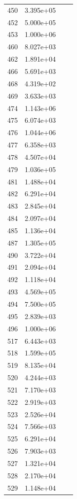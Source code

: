 \documentclass[12pt]{article}
\begin{document}
\begin{longtable}{@{}cccc@{}}
450 & 3.395e+05 &  &  \\
452 & 5.000e+05 &  &  \\
453 & 1.000e+06 &  &  \\
460 & 8.027e+03 &  &  \\
462 & 1.891e+04 &  &  \\
466 & 5.691e+03 &  &  \\
468 & 4.319e+02 &  &  \\
469 & 3.633e+03 &  &  \\
474 & 1.143e+06 &  &  \\
475 & 6.074e+03 &  &  \\
476 & 1.044e+06 &  &  \\
477 & 6.358e+03 &  &  \\
478 & 4.507e+04 &  &  \\
479 & 1.036e+05 &  &  \\
481 & 1.488e+04 &  &  \\
482 & 6.291e+04 &  &  \\
483 & 2.845e+04 &  &  \\
484 & 2.097e+04 &  &  \\
485 & 1.136e+04 &  &  \\
487 & 1.305e+05 &  &  \\
490 & 3.722e+04 &  &  \\
491 & 2.094e+04 &  &  \\
492 & 1.118e+04 &  &  \\
493 & 4.569e+05 &  &  \\
494 & 7.500e+05 &  &  \\
495 & 2.839e+03 &  &  \\
496 & 1.000e+06 &  &  \\
517 & 6.443e+03 &  &  \\
518 & 1.599e+05 &  &  \\
519 & 8.135e+04 &  &  \\
520 & 4.244e+03 &  &  \\
521 & 7.170e+03 &  &  \\
522 & 2.919e+03 &  &  \\
523 & 2.526e+04 &  &  \\
524 & 7.566e+03 &  &  \\
525 & 6.291e+04 &  &  \\
526 & 7.903e+03 &  &  \\
527 & 1.321e+04 &  &  \\
528 & 2.170e+04 &  &  \\
529 & 1.148e+04 &  &  \\

\end{longtable}
\end{document}
